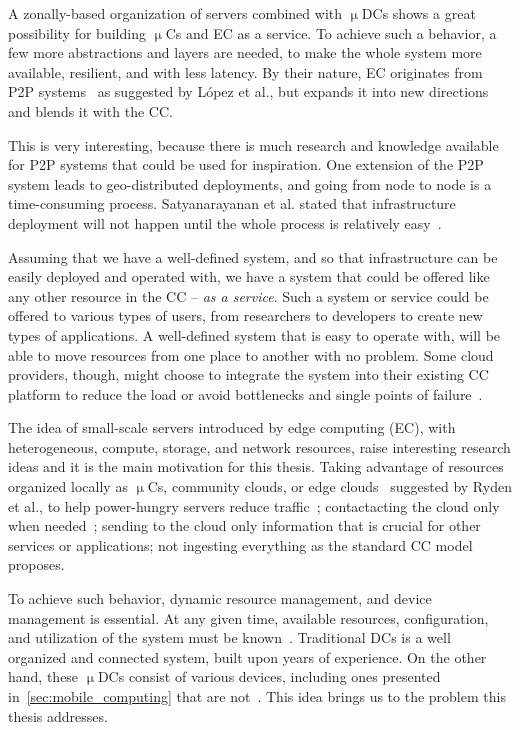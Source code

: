 A zonally-based organization of servers combined with $\upmu$DCs shows a great possibility for building $\upmu$Cs and EC as a service. To achieve such a behavior, a few more abstractions and layers are needed, to make the whole system more available, resilient, and with less latency. By their nature, EC originates from P2P systems~\cite{LopezMEDHIBFR15} as suggested by L{\'{o}}pez et al., but expands it into new directions and blends it with the CC. 

This is very interesting, because there is much research and knowledge available for P2P systems that could be used for inspiration. One extension of the P2P system leads to geo-distributed deployments, and going from node to node is a time-consuming process. Satyanarayanan et al. stated that infrastructure deployment will not happen until the whole process is relatively easy~\cite{SatyanarayananBCD09}. 

Assuming that we have a well-defined system, and so that infrastructure can be easily deployed and operated with, we have a system that could be offered like any other resource in the CC -- \emph{as a service}. Such a system or service could be offered to various types of users, from researchers to developers to create new types of applications. A well-defined system that is easy to operate with, will be able to move resources from one place to another with no problem. Some cloud providers, though, might choose to integrate the system into their existing CC platform to reduce the load or avoid bottlenecks and single points of failure~\cite{JararwehDAAAB16}.

The idea of small-scale servers introduced by edge computing (EC), with heterogeneous, compute, storage, and network resources, raise interesting research ideas and it is the main motivation for this thesis. Taking advantage of resources organized locally as $\upmu$Cs, community clouds, or edge clouds~\cite{RydenOCW14, SimicAccess} suggested by Ryden et al., to help power-hungry servers reduce traffic~\cite{HirschMZ18}; contactacting the cloud only when needed~\cite{inproceedingsSimic1}; sending to the cloud only information that is crucial for other services or applications; not ingesting everything as the standard CC model proposes.

To achieve such behavior, dynamic resource management, and device management is essential. At any given time, available resources, configuration, and utilization of the system must be known~\cite{GubbiBMP13, WangZZWYW17}. Traditional DCs is a well organized and connected system, built upon years of experience. On the other hand, these $\upmu$DCs consist of various devices, including ones presented in~\ref{sec:mobile_computing} that are not~\cite{JiangCGZW19}. This idea brings us to the problem this thesis addresses.

